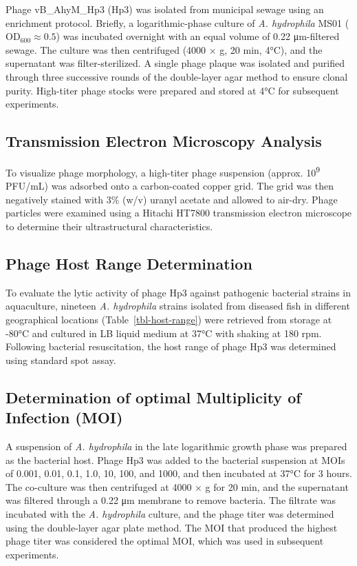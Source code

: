 \documentclass[11pt,a4paper]{article}
\begin{document}
Phage vB\_AhyM\_Hp3 (Hp3) was isolated from municipal sewage using an
enrichment protocol. Briefly, a logarithmic-phase culture of \emph{A.
hydrophila} MS01 (\(\mathrm{OD}_{600} \approx 0.5\)) was incubated
overnight with an equal volume of 0.22 μm-filtered sewage. The culture
was then centrifuged (4000 × g, 20 min, 4°C), and the supernatant was
filter-sterilized. A single phage plaque was isolated and purified
through three successive rounds of the double-layer agar method to
ensure clonal purity. High-titer phage stocks were prepared and stored
at 4°C for subsequent experiments.

\subsection{Transmission Electron Microscopy
Analysis}\label{transmission-electron-microscopy-analysis}

To visualize phage morphology, a high-titer phage suspension (approx.
10\textsuperscript{9} PFU/mL) was adsorbed onto a carbon-coated copper
grid. The grid was then negatively stained with 3\% (w/v) uranyl acetate
and allowed to air-dry. Phage particles were examined using a Hitachi
HT7800 transmission electron microscope to determine their
ultrastructural characteristics.

\subsection{Phage Host Range
Determination}\label{phage-host-range-determination}

To evaluate the lytic activity of phage Hp3 against pathogenic bacterial
strains in aquaculture, nineteen \emph{A. hydrophila} strains isolated
from diseased fish in different geographical locations
(Table~\ref{tbl-host-range}) were retrieved from storage at -80°C and
cultured in LB liquid medium at 37°C with shaking at 180 rpm. Following
bacterial resuscitation, the host range of phage Hp3 was determined
using standard spot assay.

\subsection{Determination of optimal Multiplicity of Infection
(MOI)}\label{determination-of-optimal-multiplicity-of-infection-moi}

A suspension of \emph{A. hydrophila} in the late logarithmic growth
phase was prepared as the bacterial host. Phage Hp3 was added to the
bacterial suspension at MOIs of 0.001, 0.01, 0.1, 1.0, 10, 100, and 1000,
and then incubated at 37°C for 3 hours. The co-culture was then
centrifuged at 4000 × g for 20 min, and the supernatant was filtered
through a 0.22 μm membrane to remove bacteria. The filtrate was
incubated with the \emph{A. hydrophila} culture, and the phage titer was
determined using the double-layer agar plate method. The MOI that
produced the highest phage titer was considered the optimal MOI, which
was used in subsequent experiments.
\end{document}
